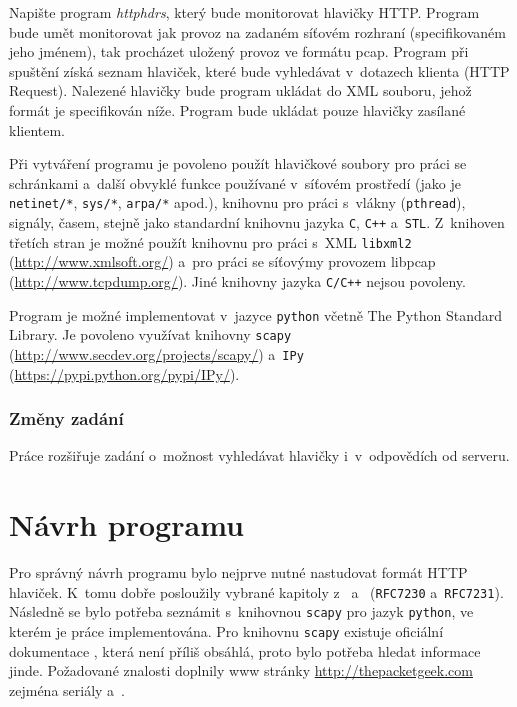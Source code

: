 \documentclass[a4paper, 11pt, titlepage]{article}
\begin{document}
		Napište program \textit{httphdrs}, který bude monitorovat hlavičky HTTP. Program bude umět monitorovat jak provoz na zadaném síťovém rozhraní (specifikovaném jeho jménem), tak procházet uložený provoz ve formátu pcap. Program při spuštění získá seznam hlaviček, které bude vyhledávat v~dotazech klienta (HTTP Request). Nalezené hlavičky bude program ukládat do XML souboru, jehož formát je specifikován níže. Program bude ukládat pouze hlavičky zasílané klientem.

		Při vytváření programu je povoleno použít hlavičkové soubory pro práci se schránkami a~další obvyklé funkce používané v~síťovém prostředí (jako je \texttt{netinet/*}, \texttt{sys/*}, \texttt{arpa/*} apod.), knihovnu pro práci s~vlákny (\texttt{pthread}), signály, časem, stejně jako standardní knihovnu jazyka \texttt{C}, \texttt{C++} a~\texttt{STL}. Z~knihoven třetích stran je možné použít knihovnu pro práci s~XML \texttt{libxml2} (\url{http://www.xmlsoft.org/}) a~pro práci se síťovýmy provozem libpcap (\url{http://www.tcpdump.org/}). Jiné knihovny jazyka \texttt{C/C++} nejsou povoleny.

		Program je možné implementovat v~jazyce \texttt{python} včetně The Python Standard Library. Je povoleno využívat knihovny \texttt{scapy} (\url{http://www.secdev.org/projects/scapy/}) a~\texttt{IPy} (\url{https://pypi.python.org/pypi/IPy/}).


		\subsubsection{Změny zadání} %
		\label{ssub:zmeny}
			Práce rozšiřuje zadání o~možnost vyhledávat hlavičky i~v~odpovědích od serveru. 	



\newpage

\section{Návrh programu} %
\label{sec:navrh_programu}

	Pro správný návrh programu bylo nejprve nutné nastudovat formát HTTP 
	hlaviček. K~tomu dobře posloužily vybrané kapitoly z~\citep{RFC7230}
a~\citep{RFC7231} (\texttt{RFC7230} a~\texttt{RFC7231}). Následně se bylo 
	potřeba seznámit s~knihovnou \texttt{scapy} pro jazyk \texttt{python}, 
	ve kterém je práce implementována. Pro knihovnu \texttt{scapy} existuje 
	oficiální dokumentace \citep{scapy:doc}, která není příliš obsáhlá,
	proto bylo potřeba hledat informace jinde. Požadované znalosti 
	doplnily www stránky \url{http://thepacketgeek.com} zejména seriály 
	\citep{thePacketGeek:packets} a~\citep{thePacketGeek:sniffing}. 
\end{document}
